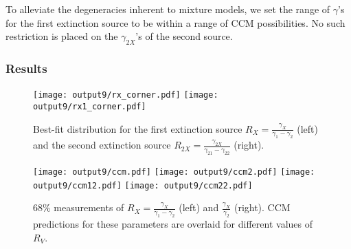 \documentclass[11pt, oneside]{article}   	%
\begin{document}
To alleviate the degeneracies inherent to mixture models, we set the range of $\gamma$'s for the first extinction source to be within
a range of CCM possibilities.  No such restriction is placed on the $\gamma_{2X}$'s of the second source.

\subsubsection{Results}

\begin{figure}[htbp] %
   \centering
   \texttt{[image: output9/rx\_corner.pdf]}
      \texttt{[image: output9/rx1\_corner.pdf]} 
   \caption{Best-fit distribution for the first extinction source  $R_X=\frac{\gamma_X}{\gamma_1-\gamma_2}$ (left) and
   the second extinction source
   $R_{2X}=\frac{\gamma_{2X}}{\gamma_{21}-\gamma_{22}}$ (right).
   \label{rx:fig}}
\end{figure}

\begin{figure}[htbp] %
   \centering
   \texttt{[image: output9/ccm.pdf]}
      \texttt{[image: output9/ccm2.pdf]} 
         \texttt{[image: output9/ccm12.pdf]}
      \texttt{[image: output9/ccm22.pdf]} 
   \caption{68\% measurements of $R_X=\frac{\gamma_X}{\gamma_1-\gamma_2}$ (left) and $\frac{\gamma_X}{\gamma_2}$ (right).  CCM
   predictions for these parameters are overlaid for different values of $R_V$.}
   \label{ccm:fig}
\end{figure}
\end{document}

